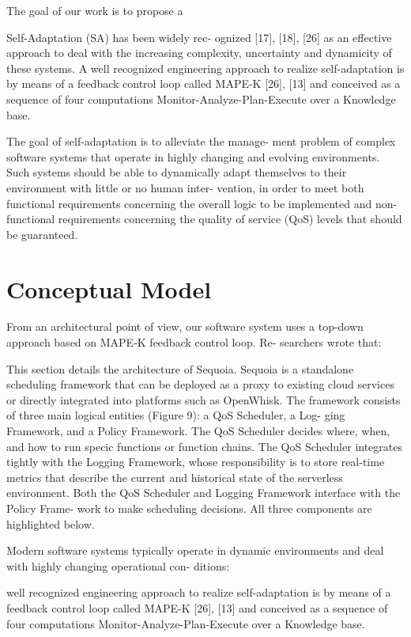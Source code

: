 \documentclass[12pt,a4paper]{report}
\theoremstyle{definition}
\begin{document}
The goal of our work is to propose a 



Self-Adaptation (SA) has been widely rec-
ognized [17], [18], [26] as an effective approach to deal
with the increasing complexity, uncertainty and dynamicity
of these systems. A well recognized engineering approach
to realize self-adaptation is by means of a feedback control
loop called MAPE-K [26], [13] and conceived as a sequence
of four computations Monitor-Analyze-Plan-Execute over a
Knowledge base.




The goal of self-adaptation is to alleviate the manage-
ment problem of complex software systems that operate
in highly changing and evolving environments. Such
systems should be able to dynamically adapt themselves
to their environment with little or no human inter-
vention, in order to meet both functional requirements
concerning the overall logic to be implemented and non-
functional requirements concerning the quality of service
(QoS) levels that should be guaranteed.

\chapter{Conceptual Model}


From an architectural point of view, our software system uses a top-down approach based on MAPE-K feedback control loop. Re-
searchers wrote that:


This section details the architecture of Sequoia. Sequoia is a
standalone scheduling framework that can be deployed as a
proxy to existing cloud services or directly integrated into
platforms such as OpenWhisk. The framework consists of
three main logical entities (Figure 9): a QoS Scheduler, a Log-
ging Framework, and a Policy Framework. The QoS Scheduler
decides where, when, and how to run specic functions or
function chains. The QoS Scheduler integrates tightly with
the Logging Framework, whose responsibility is to store
real-time metrics that describe the current and historical
state of the serverless environment. Both the QoS Scheduler
and Logging Framework interface with the Policy Frame-
work to make scheduling decisions. All three components
are highlighted below.


Modern software systems typically operate in dynamic
environments and deal with highly changing operational con-
ditions: 

 well recognized engineering approach
to realize self-adaptation is by means of a feedback control
loop called MAPE-K [26], [13] and conceived as a sequence
of four computations Monitor-Analyze-Plan-Execute over a
Knowledge base.
\end{document}
